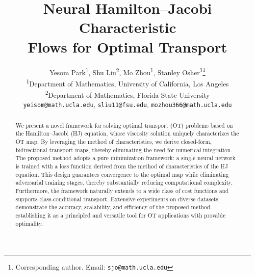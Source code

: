 \documentclass{article} %
\title{Neural Hamilton--Jacobi Characteristic \\ Flows for Optimal Transport}
\author{
Yesom Park\textsuperscript{1}, 
Shu Liu\textsuperscript{2}, 
Mo Zhou\textsuperscript{1}, 
Stanley Osher\textsuperscript{1}\thanks{Corresponding author. Email: \texttt{sjo@math.ucla.edu}} \\
\textsuperscript{1}Department of Mathematics, University of California, Los Angeles \\
\textsuperscript{2}Department of Mathematics, Florida State University \\
\texttt{yeisom@math.ucla.edu}, \texttt{sliu11@fsu.edu},
\texttt{mozhou366@math.ucla.edu}
}
\theoremstyle{plain}
\theoremstyle{definition}
\theoremstyle{remark}
\begin{document}
\maketitle

\begin{abstract}
We present a novel framework for solving optimal transport (OT) problems based on the Hamilton--Jacobi (HJ) equation, whose viscosity solution uniquely characterizes the OT map. By leveraging the method of characteristics, we derive closed-form, bidirectional transport maps, thereby eliminating the need for numerical integration. 
The proposed method adopts a pure minimization framework: a single neural network is trained with a loss function derived from the method of characteristics of the HJ equation. This design guarantees convergence to the optimal map while eliminating adversarial training stages, thereby substantially reducing computational complexity. Furthermore, the framework naturally extends to a wide class of cost functions and supports class-conditional transport. Extensive experiments on diverse datasets demonstrate the accuracy, scalability, and efficiency of the proposed method, establishing it as a principled and versatile tool for OT applications with provable optimality.
\end{abstract}
\end{document}
